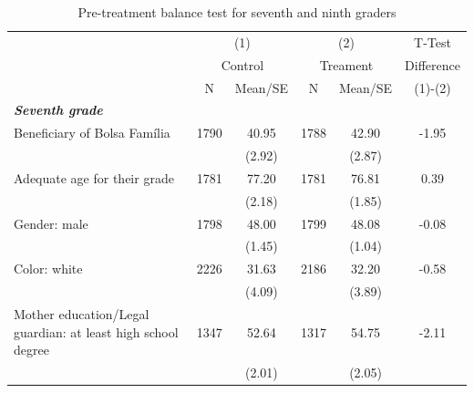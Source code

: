 \documentclass[
	article,			%
	12pt,				%
	oneside,			%
	a4paper,			%
	]{article}
\begin{document}


\begin{table}[h!]
  \centering
  \fontsize{8}{11}\selectfont
  \caption{Pre-treatment balance test for seventh and ninth graders}
\begin{tabular}{lccccc}
\hline
\hline
           & \multicolumn{ 2}{c}{(1)} & \multicolumn{ 2}{c}{(2)} &     T-Test \\

           & \multicolumn{ 2}{c}{Control} & \multicolumn{ 2}{c}{Treament} & Difference \\

           &          N &    Mean/SE &          N &    Mean/SE &    (1)-(2) \\
\hline
{\it {\bf Seventh grade}} &            &            &            &            &            \\

Beneficiary of Bolsa Família &       1790 &      40.95 &       1788 &      42.90 &      -1.95 \\

           &            &     (2.92) &            &     (2.87) &            \\

Adequate age for their grade &       1781 &      77.20 &       1781 &      76.81 &       0.39 \\

           &            &     (2.18) &            &     (1.85) &            \\

Gender: male &       1798 &      48.00 &       1799 &      48.08 &      -0.08 \\

           &            &     (1.45) &            &     (1.04) &            \\

Color: white &       2226 &      31.63 &       2186 &      32.20 &      -0.58 \\

           &            &     (4.09) &            &     (3.89) &            \\

Mother education/Legal guardian: at least high school degree &       1347 &      52.64 &       1317 &      54.75 &      -2.11 \\

           &            &     (2.01) &            &     (2.05) &            \\


\end{tabular}
\end{table}
\end{document}

